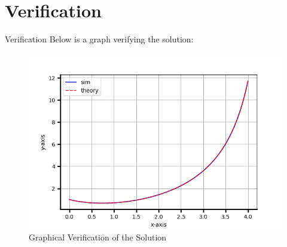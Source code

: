 \documentclass{beamer}
\begin{document}
\section{Verification}
\begin{frame}{Verification}
Below is a graph verifying the solution:
\begin{figure}[h]
    \centering
    \includegraphics[width=0.8\columnwidth]{fig/Figure_1.png}
    \caption{Graphical Verification of the Solution}
\end{figure}
\end{frame}
\end{document}
